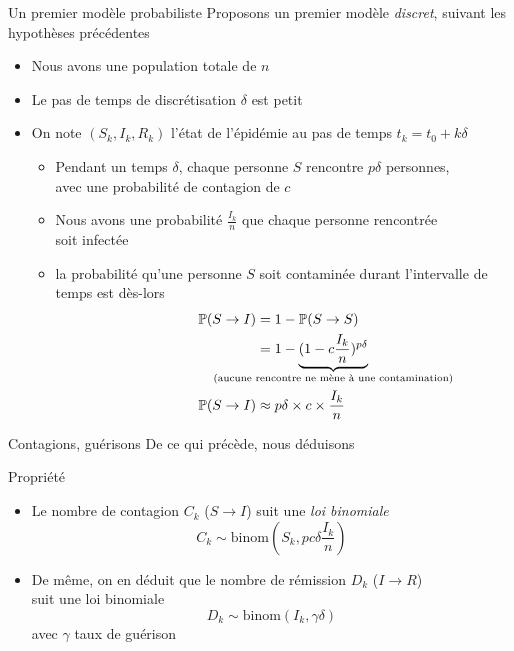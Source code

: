 \documentclass[10pt]{beamer}
\begin{document}
\begin{frame}{Un premier modèle probabiliste}
  Proposons un premier modèle \emph{discret}, suivant les hypothèses précédentes
  \begin{itemize}
    \item Nous avons une population totale de $n$
    \item Le pas de temps de discrétisation $\delta$ est petit \\
    \item On note $(S_k, I_k, R_k)$ l'état de l'épidémie au pas de temps $t_k = t_0 + k\delta$
      \begin{itemize}
        \item Pendant un temps $\delta$, chaque personne $S$ rencontre $p\delta$ personnes,\\
          avec une probabilité de contagion de $c$
        \item Nous avons une probabilité $\frac{I_k}{n}$ que chaque personne rencontrée \\ soit infectée
        \item la probabilité qu'une personne $S$ soit contaminée durant l'intervalle de temps est dès-lors
          \[
            \begin{aligned}
              \PP(S \to I) &= 1 - \PP(S \to S)  \\
                           &= 1 - \underbrace{(1 - c \frac{I_k}{n})^{p \delta}}_{\mathclap{\text{(aucune rencontre ne mène à une contamination)}}} \\
              \PP(S \to I)&\approx p \delta \times c \times \frac{I_k}{n}
            \end{aligned}
          \]
      \end{itemize}
  \end{itemize}
\end{frame}

\begin{frame}{Contagions, guérisons}
  De ce qui précède, nous déduisons
  \begin{block}{Propriété}
    \begin{itemize}
      \item Le nombre de contagion $C_k$ ($S \to I$) suit une \emph{loi binomiale}
        \[
          C_k \sim \text{binom}(S_k, pc\delta \frac{I_k}{n})
        \]
        \vspace{-.5cm}
      \item De même, on en déduit que le nombre de rémission $D_k$ ($I \to R$) \\
        suit une loi binomiale
        \[
          D_k \sim \text{binom}(I_k, \gamma \delta)
        \]
        avec $\gamma$ taux de guérison
    \end{itemize}
  \end{block}
\end{frame}
\end{document}

